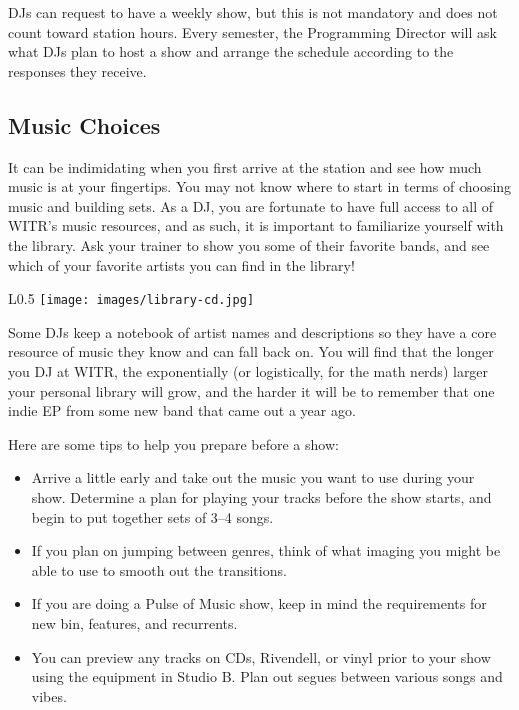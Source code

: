 \documentclass{witrman}
\begin{document}
DJs can request to have a weekly show, but this is not mandatory and does not
count toward station hours.  Every semester, the Programming Director will ask
what DJs plan to host a show and arrange the schedule according to the responses
they receive.  


\subsection{Music Choices}

It can be indimidating when you first arrive at the station and see how much
music is at your fingertips.  You may not know where to start in terms of
choosing music and building sets.  As a DJ, you are fortunate to have full
access to all of WITR's music resources, and as such, it is important to
familiarize yourself with the library.  Ask your trainer to show you some of
their favorite bands, and see which of your favorite artists you can find in
the library!

\begin{wrapfigure}{L}{0.5\linewidth}
    \texttt{[image: images/library-cd.jpg]}
\end{wrapfigure}

Some DJs keep a notebook of artist names and descriptions so they have a core
resource of music they know and can fall back on.  You will find that the longer
you DJ at WITR, the exponentially (or logistically, for the math nerds) larger
your personal library will grow, and the harder it will be to remember that one
indie EP from some new band that came out a year ago.

Here are some tips to help you prepare before a show:
\begin{itemize}
    \item Arrive a little early and take out the music you want to use during
        your show.  Determine a plan for playing your tracks before the show
        starts, and begin to put together sets of 3--4 songs.
    \item If you plan on jumping between genres, think of what imaging you might
        be able to use to smooth out the transitions.
    \item If you are doing a Pulse of Music show, keep in mind the requirements
        for new bin, features, and recurrents.
    \item You can preview any tracks on CDs, Rivendell, or vinyl prior to your
        show using the equipment in Studio B.  Plan out segues between various
        songs and vibes.
\end{itemize}
\end{document}

